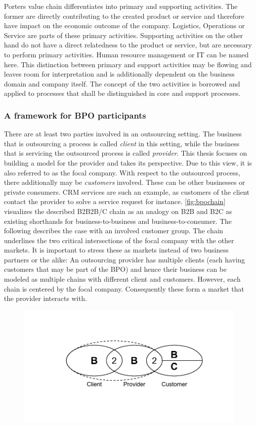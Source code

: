 	Porters value chain differentiates into primary and supporting activities. The former are directly contributing to the created product or service and therefore have impact on the economic outcome of the company. Logistics, Operations or Service are parts of these primary activities. Supporting activities on the other hand do not have a direct relatedness to the product or service, but are necessary to perform primary activities. Human resource management or IT can be named here. This distinction between primary and support activities may be flowing and leaves room for interpretation and is additionally dependent on the business domain and company itself. The concept of the two activities is borrowed and applied to processes that shall be distinguished in core and support processes. 
	 

		
		\subsubsection{A framework for BPO participants}
	There are at least two parties involved in an outsourcing setting. The business that is outsourcing a process is called \textit{client} in this setting, while the business that is servicing the outsourced process is called \textit{provider}. This thesis focuses on building a model for the provider and takes its perspective. Due to this view, it is also referred to as the focal company. With respect to the outsourced process, there additionally may be \textit{customers} involved. These can be other businesses or private consumers. CRM services are such an example, as customers of the client contact the provider to solve a service request for instance. \ref{fig:bpochain} visualizes the described B2B2B/C chain as an analogy on B2B and B2C as existing shorthands for business-to-business and business-to-consumer. The following describes the case with an involved customer group. The chain underlines the two critical intersections of the focal company with the other markets. It is important to stress these as markets instead of two business partners or the alike: An outsourcing provider has multiple clients (each having customers that may be part of the BPO) and hence their business can be modeled as multiple chains with different client and customers. However, each chain is centered by the focal company. Consequently these form a market that the provider interacts with.
	
			\begin{figure}[caption={BPO B2B2B/C Chain}, label={fig:bpochain}]
		{	\includegraphics[width=.8\textwidth]{figures/bpochain.pdf}}
	\end{figure}

